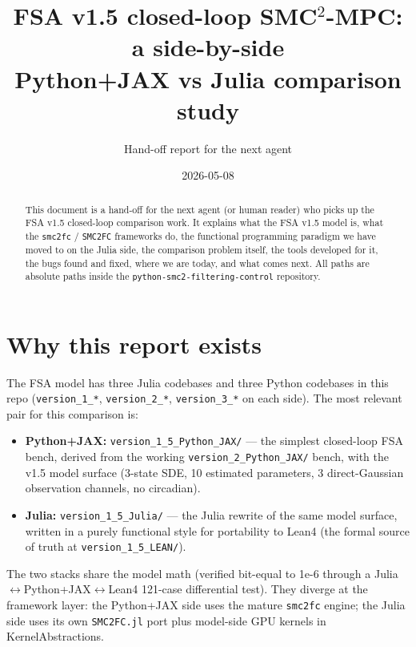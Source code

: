 \documentclass[11pt,a4paper]{article}
\title{FSA v1.5 closed-loop SMC$^2$-MPC: a side-by-side\\
       Python+JAX vs Julia comparison study}
\author{Hand-off report for the next agent}
\date{2026-05-08}
\begin{document}
\maketitle
\tableofcontents

\begin{abstract}
This document is a hand-off for the next agent (or human reader)
who picks up the FSA v1.5 closed-loop comparison work. It explains
what the FSA v1.5 model is, what the \texttt{smc2fc} / \texttt{SMC2FC}
frameworks do, the functional programming paradigm we have moved
to on the Julia side, the comparison problem itself, the tools
developed for it, the bugs found and fixed, where we are today,
and what comes next. All paths are absolute paths inside the
\texttt{python-smc2-filtering-control} repository.
\end{abstract}

\section{Why this report exists}

The FSA model has three Julia codebases and three Python codebases
in this repo (\texttt{version\_1\_*}, \texttt{version\_2\_*},
\texttt{version\_3\_*} on each side). The most relevant pair for
this comparison is:

\begin{itemize}[itemsep=2pt]
  \item \textbf{Python+JAX:} \texttt{version\_1\_5\_Python\_JAX/}
        --- the simplest closed-loop FSA bench, derived from the
        working \texttt{version\_2\_Python\_JAX/} bench, with the
        v1.5 model surface (3-state SDE, 10 estimated parameters,
        3 direct-Gaussian observation channels, no circadian).
  \item \textbf{Julia:} \texttt{version\_1\_5\_Julia/} --- the
        Julia rewrite of the same model surface, written in a
        purely functional style for portability to Lean4 (the
        formal source of truth at \texttt{version\_1\_5\_LEAN/}).
\end{itemize}

The two stacks share the model math (verified bit-equal to 1e-6
through a Julia$\leftrightarrow$Python+JAX$\leftrightarrow$Lean4
121-case differential test). They diverge at the framework layer:
the Python+JAX side uses the mature \texttt{smc2fc} engine; the
Julia side uses its own \texttt{SMC2FC.jl} port plus model-side
GPU kernels in KernelAbstractions.
\end{document}
